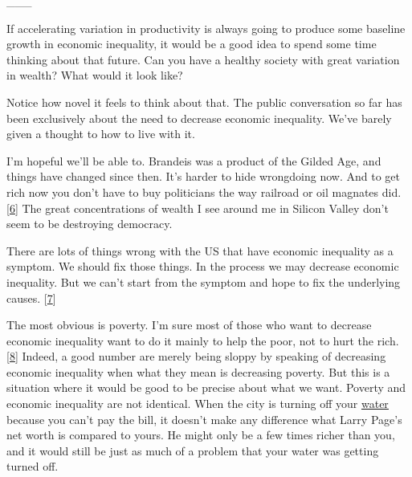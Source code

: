                   \_\_\_
                  

If accelerating variation in productivity is
                  always going to produce some baseline growth in economic
                  inequality, it would be a good idea to spend some time
                  thinking about that future. Can you have a healthy society
                  with great variation in wealth? What would it look like?

Notice
                  how novel it feels to think about that. The public
                  conversation so far has been exclusively about the need to
                  decrease economic inequality. We've barely given a thought to
                  how to live with it.

I'm hopeful we'll be able to.
                  Brandeis was a product of the Gilded Age, and things have
                  changed since then. It's harder to hide wrongdoing now. And to
                  get rich now you don't have to buy politicians the way
                  railroad or oil magnates did.
                  [\href{\#f6n}{6}]
                  The great concentrations of wealth I see around me in Silicon
                  Valley don't seem to be destroying democracy.

There
                  are lots of things wrong with the US that have economic
                  inequality as a symptom. We should fix those things. In the
                  process we may decrease economic inequality. But we can't
                  start from the symptom and hope to fix the underlying causes.
                  [\href{\#f7n}{7}]

The most obvious is poverty. I'm sure most of
                  those who want to decrease economic inequality want to do it
                  mainly to help the poor, not to hurt the rich.
                  [\href{\#f8n}{8}]
                  Indeed, a good number are merely being sloppy by speaking of
                  decreasing economic inequality when what they mean is
                  decreasing poverty. But this is a situation where it would be
                  good to be precise about what we want. Poverty and economic
                  inequality are not identical. When the city is turning off
                  your
                  \href{http://www.theatlantic.com/business/archive/2014/07/what-happens-when-detroit-shuts-off-the-water-of-100000-people/374548/}{\underline{water}}
                  because you can't pay the bill, it doesn't make any difference
                  what Larry Page's net worth is compared to yours. He might
                  only be a few times richer than you, and it would still be
                  just as much of a problem that your water was getting turned
                  off.

